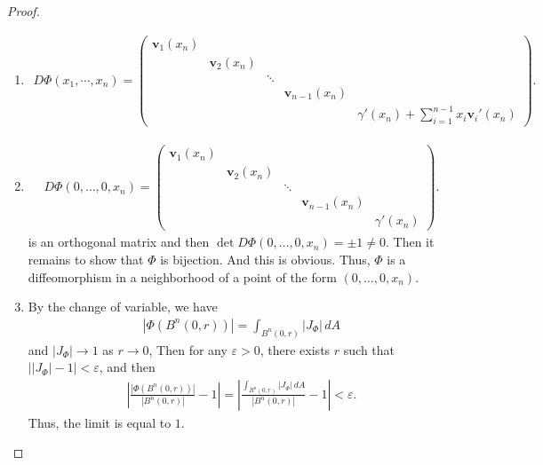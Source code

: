 \documentclass[11pt]{article}
\theoremstyle{definition}
\numberwithin{equation}{subsection}
\begin{document}
\begin{proof}
~\begin{enumerate}[label=(\alph*)]
    \item 
    \begin{align*}
        D\Phi(x_1,\cdots,x_n) = \begin{pmatrix}
            \mathbf{v}_1(x_n) &  &  &  &  \\
            & \mathbf{v}_2(x_n) &  &  &  \\
            &  & \ddots &  & \\
            &  &  & \mathbf{v}_{n-1}(x_n) \\
            &  &  &  & \gamma'(x_n) + \sum^{n-1}_{i=1}x_i \mathbf{v}_i'(x_n)
        \end{pmatrix}.
    \end{align*}
    
    \item 
    \begin{align*}
        D\Phi(0,\ldots, 0, x_n) = \begin{pmatrix}
            \mathbf{v}_1(x_n) &  &  &  &  \\
            & \mathbf{v}_2(x_n) &  &  &  \\
            &  & \ddots &  & \\
            &  &  & \mathbf{v}_{n-1}(x_n) \\
            &  &  &  & \gamma'(x_n)
        \end{pmatrix}.
    \end{align*}
    is an orthogonal matrix and then $\det D\Phi(0,\ldots, 0, x_n) = \pm 1 \neq 0$. Then it remains to show that $\Phi$ is bijection. And this is obvious. Thus, $\Phi$ is a diffeomorphism in a neighborhood of a point of the form $(0,\ldots,0,x_n)$.
    
    \item By the change of variable, we have
    \begin{align*}
        \left|\Phi(B^n(0,r))\right| = \int_{B^n(0,r)} |J_\Phi|\, dA
    \end{align*}
    and $|J_\Phi| \to 1$ as $r \to 0$, Then for any $\varepsilon > 0$, there exists $r$ such that $\left||J_\Phi| - 1\right| < \varepsilon$, and then
    \begin{align*}
        \left|\frac{|\Phi(B^n(0,r))|}{|B^n(0,r)|} - 1\right| = \left|\frac{\int_{B^n(0,r)} |J_\Phi|\, dA}{|B^n(0,r)|} - 1\right|< \varepsilon.
    \end{align*}
    Thus, the limit is equal to $1$.
\end{enumerate}
\end{proof}
\end{document}
